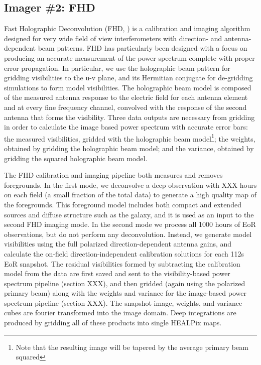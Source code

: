 \subsection{Imager \#2: FHD}
Fast Holographic Deconvolution (FHD, \citet{an_Bunton_Cappallo_et_al__2012}) is a calibration and imaging algorithm designed for very wide field of view interferometers with direction- and antenna-dependent beam patterns. FHD has particularly been designed with a focus on producing an accurate measurement of the power spectrum complete with proper error propagation. In particular, we use the holographic beam pattern for gridding visibilities to the u-v plane, and its Hermitian conjugate for de-gridding simulations to form model visibilities. The holographic beam model is composed of the measured antenna response to the electric field for each antenna element and at every fine frequency channel, convolved with the response of the second antenna that forms the visibility. Three data outputs are necessary from gridding in order to calculate the image based power spectrum with accurate error bars: the measured visibilities, gridded with the holographic beam model\footnote{Note that the resulting image will be tapered by the average primary beam squared}; the weights, obtained by gridding the holographic beam model; and the variance, obtained by gridding the squared holographic beam model.

The FHD calibration and imaging pipeline both measures and removes foregrounds. In the first mode, we deconvolve a deep observation with XXX hours on each field (a small fraction of the total data) to generate a high quality map of the foregrounds. This foreground model includes both compact and extended sources and diffuse structure such as the galaxy, and it is used as an input to the second FHD imaging mode. In the second mode we process all 1000 hours of EoR observations, but do not perform any deconvolution. Instead, we generate model visibilities using the full polarized direction-dependent antenna gains, and calculate the on-field direction-independent calibration solutions for each 112s EoR snapshot. The residual visibilities formed by subtracting the calibration model from the data are first saved and sent to the visibility-based power spectrum pipeline (section XXX), and then gridded (again using the polarized primary beam) along with the weights and variance for the image-based power spectrum pipeline (section XXX). The snapshot image, weights, and variance cubes are fourier transformed into the image domain. Deep integrations are produced by gridding all of these products into single HEALPix maps.
